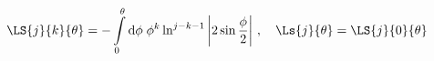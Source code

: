 \begin{equation}
\label{def_Ls}
\LS{j}{k}{\theta} =   - \int\limits_0^\theta {\rm d}\phi \;
   \phi^k \ln^{j-k-1} \left| 2\sin\frac{\phi}{2}\right| \, ,
\quad 
\Ls{j}{\theta} = \LS{j}{0}{\theta} \; 
\end{equation}

